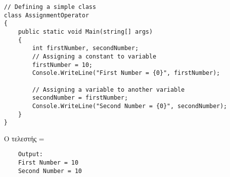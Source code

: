 \begin{listing}[H]
\begin{verbatim}
// Defining a simple class
class AssignmentOperator
{
    public static void Main(string[] args)
    {
        int firstNumber, secondNumber;
        // Assigning a constant to variable
        firstNumber = 10;
        Console.WriteLine("First Number = {0}", firstNumber);

        // Assigning a variable to another variable
        secondNumber = firstNumber;
        Console.WriteLine("Second Number = {0}", secondNumber);
    }
}
\end{verbatim}
\caption{Ο τελεστής =}
\label{flagExec}
\end{listing}

\begin{verbatim}
    Output:
    First Number = 10
    Second Number = 10
\end{verbatim}